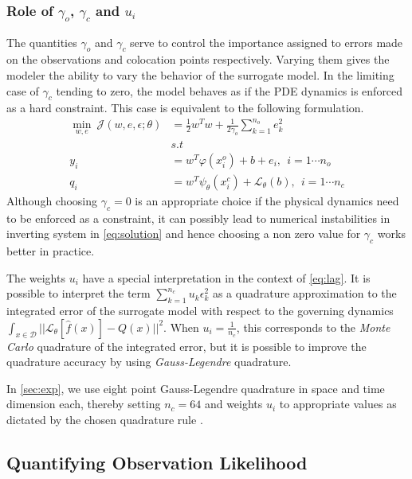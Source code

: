 \subsubsection*{Role of $\gamma_o$, $\gamma_c$ and $u_i$}

The quantities $\gamma_o$ and $\gamma_c$ serve to control the importance assigned to errors made 
on the observations and colocation points respectively. Varying them gives the modeler the ability 
to vary the behavior of the surrogate model. In the limiting case of $\gamma_c$ tending to zero, 
the model behaves as if the PDE dynamics is enforced as a hard constraint. This case is equivalent 
to the following formulation.
%
\begin{equation}\label{eq:surrogate2}
   \begin{aligned}
    \min_{w,e} \ \mathcal{J}(w,e,\epsilon;\theta) &= 
    \frac{1}{2} w^{T}w + \frac{1}{2\gamma_{o}} \sum_{k = 1}^{n_{o}}{e^{2}_{k}} \\
    & s.t \\
    y_{i} & = w^{T}\varphi(x^{o}_{i}) + b + e_{i}, \ \ i = 1 \cdots n_{o} \\
    q_{i} & = w^{T}\psi_{\theta}(x^{c}_{i}) + \mathcal{L}_{\theta}(b), \ \ i = 1 \cdots n_{c}
   \end{aligned}
\end{equation}
%
Although choosing $\gamma_c = 0$ is an appropriate choice if the physical dynamics need to be 
enforced as a constraint, it can possibly lead to numerical instabilities in inverting system in 
\cref{eq:solution} and hence choosing a non zero value for $\gamma_c$ works better in practice. 

The weights $u_i$ have a special interpretation in the context of \cref{eq:lag}. It is possible to
interpret the term $\sum_{k = 1}^{n_{c}}{u_{k} \epsilon^{2}_{k}}$ as a quadrature approximation
to the integrated error of the surrogate model with respect to the governing dynamics 
$\int_{x \in \mathcal{D}}{||\mathcal{L}_{\theta} [\hat{f}(x)] - Q(x)||^2}$. When 
$u_i = \frac{1}{n_c}$, this corresponds to the \emph{Monte Carlo} quadrature of the integrated 
error, but it is possible to improve the quadrature accuracy by using \emph{Gauss-Legendre} 
quadrature.

In \cref{sec:exp}, we use eight point Gauss-Legendre quadrature in space and time 
dimension each, thereby setting $n_c = 64$ and weights $u_i$ to appropriate values as dictated by 
the chosen quadrature rule \citep{_abramowitzm}.

\subsection{Quantifying Observation Likelihood}


